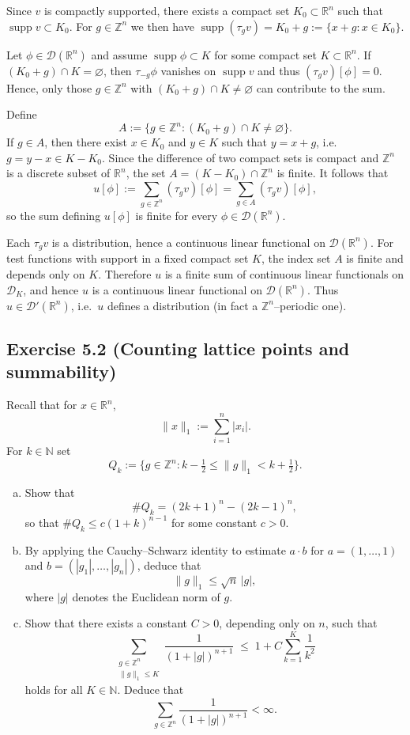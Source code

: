 \documentclass[12pt,a4paper]{article}
\theoremstyle{plain}
\theoremstyle{definition}
\theoremstyle{remark}
\theoremstyle{remark}
\begin{document}
Since $v$ is compactly supported, there exists a compact set
$K_0\subset\mathbb{R}^n$ such that
$\operatorname{supp}v\subset K_0$.  For $g\in\mathbb{Z}^n$ we then have
$\operatorname{supp}(\tau_g v) = K_0+g := \{x+g : x\in K_0\}$.

Let $\phi\in\mathcal{D}(\mathbb{R}^n)$ and assume
$\operatorname{supp}\phi\subset K$ for some compact set
$K\subset\mathbb{R}^n$.  If $(K_0+g)\cap K=\varnothing$, then
$\tau_{-g}\phi$ vanishes on $\operatorname{supp}v$ and thus
$(\tau_g v)[\phi]=0$.  Hence, only those $g\in\mathbb{Z}^n$ with
$(K_0+g)\cap K\neq\varnothing$ can contribute to the sum.

Define
\[
A := \{g\in\mathbb{Z}^n : (K_0+g)\cap K\neq\varnothing\}.
\]
If $g\in A$, then there exist $x\in K_0$ and $y\in K$ such that
$y=x+g$, i.e.\ $g=y-x\in K-K_0$.  Since the difference of two compact
sets is compact and $\mathbb{Z}^n$ is a discrete subset of
$\mathbb{R}^n$, the set $A = (K-K_0)\cap\mathbb{Z}^n$ is finite.  It
follows that
\[
u[\phi] := \sum_{g\in\mathbb{Z}^n} (\tau_g v)[\phi]
= \sum_{g\in A} (\tau_g v)[\phi],
\]
so the sum defining $u[\phi]$ is finite for every
$\phi\in\mathcal{D}(\mathbb{R}^n)$.

Each $\tau_g v$ is a distribution, hence a continuous linear functional
on $\mathcal{D}(\mathbb{R}^n)$.  For test functions with support in a
fixed compact set $K$, the index set $A$ is finite and depends only on
$K$.  Therefore $u$ is a finite sum of continuous linear functionals on
$\mathcal{D}_K$, and hence $u$ is a continuous linear functional on
$\mathcal{D}(\mathbb{R}^n)$.  Thus $u\in\mathcal{D}'(\mathbb{R}^n)$,
i.e.\ $u$ defines a distribution (in fact a $\mathbb{Z}^n$--periodic
one).

\bigskip

\subsection*{Exercise 5.2 (Counting lattice points and summability)}

Recall that for $x \in \mathbb{R}^n$,
\[
\|x\|_1 := \sum_{i=1}^n |x_i|.
\]
For $k \in \mathbb{N}$ set
\[
Q_k := \bigl\{ g \in \mathbb{Z}^n : k - \tfrac12 \le \|g\|_1 < k + \tfrac12 \bigr\}.
\]

\begin{enumerate}[(a)]
	\item Show that
	\[
	\#Q_k = (2k+1)^n - (2k-1)^n,
	\]
	so that $\#Q_k \le c(1+k)^{n-1}$ for some constant $c>0$.
	
	\item By applying the Cauchy--Schwarz identity to estimate $a\cdot b$
	for $a=(1,\dots,1)$ and $b=(|g_1|,\dots,|g_n|)$, deduce that
	\[
	\|g\|_1 \le \sqrt{n}\,|g|,
	\]
	where $|g|$ denotes the Euclidean norm of $g$.
	
	\item Show that there exists a constant $C>0$, depending only on $n$, such that
	\[
	\sum_{\substack{g\in\mathbb{Z}^n \\ \|g\|_1\le K}}
	\frac{1}{(1+|g|)^{n+1}}
	\;\le\;
	1 + C \sum_{k=1}^K \frac{1}{k^2}
	\]
	holds for all $K\in\mathbb{N}$. Deduce that
	\[
	\sum_{g\in\mathbb{Z}^n} \frac{1}{(1+|g|)^{n+1}} < \infty.
	\]
\end{enumerate}
\end{document}
